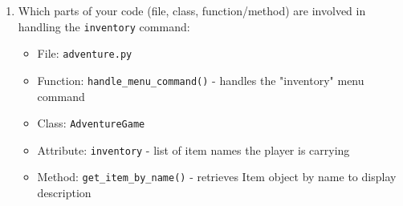 \documentclass[11pt]{article}
\begin{document}
\begin{enumerate}
    \item Which parts of your code (file, class, function/method) are involved in handling the \texttt{inventory} command:
    \begin{itemize}
        \item File: \texttt{adventure.py}
        \item Function: \texttt{handle\_menu\_command()} - handles the "inventory" menu command
        \item Class: \texttt{AdventureGame}
        \item Attribute: \texttt{inventory} - list of item names the player is carrying
        \item Method: \texttt{get\_item\_by\_name()} - retrieves Item object by name to display description
    \end{itemize}
\end{enumerate}
\end{document}
